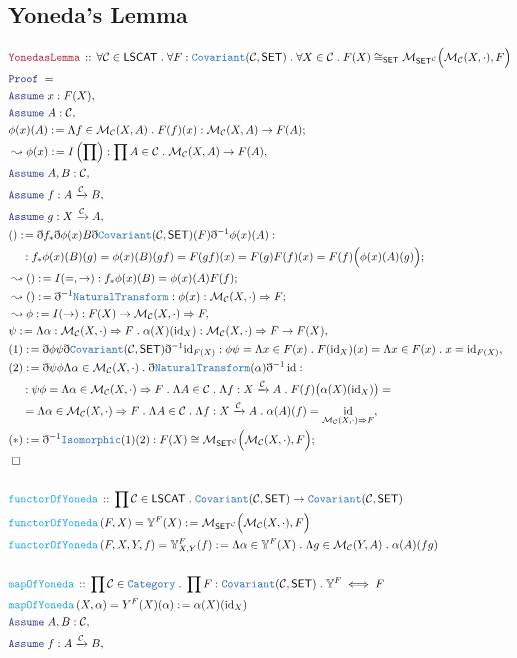 \documentclass[12pt]{scrartcl}
\newcommand{\TYPE}[1]{\textcolor{NavyBlue}{\mathtt{#1}}}
\newcommand{\FUNC}[1]{\textcolor{Cerulean}{\mathtt{#1}}}
\newcommand{\LOGIC}[1]{\textcolor{Blue}{\mathtt{#1}}}
\newcommand{\THM}[1]{\textcolor{Maroon}{\mathtt{#1}}}
\renewcommand{\.}{\; . \;}
\newcommand{\de}{: \kern 0.1pc =}
\newcommand{\Act}[1]{\left( #1 \right)}
\newcommand{\Theorem}[2]{& \THM{#1} \, :: \, #2 \\ & \Proof = \\ }
\newcommand{\DeclareFunc}[2]{& \FUNC{#1} \, :: \, #2 \\}
\newcommand{\DefineNamedFunc}[4]{&  \FUNC{#1}\Act{#2} = #3 \de #4 \\}
\newcommand{\NewLine}{\\ & \kern 1pc}
\newcommand{\Page}[1]{ \begin{align*} #1 \end{align*}   }
\newcommand{ \bd }{ \ByDef }
\DeclareMathOperator*{\id}{id}
\newcommand{\Cat}{\TYPE{Category}}
\newcommand{\Mor}{\mathcal{M}}
\newcommand{\Arrow}{\xrightarrow}
\newcommand{\Say}[3]{& #1 \de #2 : #3, \\}
\newcommand{\Conclude}[3]{& #1 \de #2 : #3; \\}
\newcommand{\Derive}[3]{& \leadsto #1 \de #2 : #3, \\}
\newcommand{\DeriveConclude}[3]{& \leadsto #1 \de #2 : #3 ; \\}
\newcommand{\Assume}[2]{& \LOGIC{Assume} \; #1 : #2, \\}
\newcommand{\QED}{\; \square}
\newcommand{\EndProof}{& \QED \\}
\newcommand{\ByDef}{\eth}
\newcommand{\Proof}{\LOGIC{Proof} \; }
\newcommand{\Cov}{\TYPE{Covariant}}
\newcommand{\NT}{\TYPE{NaturalTransform}}
\newcommand{\C}{\mathcal{C}}
\newcommand{\SET}{\mathsf{SET}}
\begin{document}
\subsection{Yoneda's Lemma}
\Page{
	\Theorem{YonedasLemma}{
		\forall \C \in \mathsf{LSCAT} \. \forall F : \Cov(\C,\SET) \. 
		\forall X \in \C  \. F(X) \cong_\SET \Mor_{\SET^\C}\Big( \Mor_\C(X,\cdot), F  \Big)
	}
	\Assume{x}{F(X)}
	\Assume{A}{\C}
	\Conclude{\phi(x)(A)}{ \Lambda f \in \Mor_\C(X,A) \. F(f)(x)  }{ \Mor_\C(X,A) \to F(A) }
	\Derive{\phi(x)}{I\left(\prod\right)}{ \prod A \in \C \. \Mor_\C(X,A) \to F(A)  }
	\Assume{A,B}{\C}
	\Assume{f}{A \Arrow{\C} B}
	\Assume{g}{X \Arrow{\C} A}
	\Conclude{()}{\bd f_* \bd \phi(x)B \bd \Cov(\C,\SET)(F) \bd^{-1} \phi(x)(A)}{ \NewLine :
		f_* \phi(x)(B)(g) = \phi(x)(B)(gf) = F(gf)(x) = F(g)F(f)(x) = F(f)\Big(\phi(x)(A)(g)\Big)  }
	\DeriveConclude{() }{ I(=,\to) }{ f_* \phi(x)(B) = \phi(x)(A)F(f) }
	\DeriveConclude{()}{\bd^{-1} \NT}{ \phi(x) : \Mor_\C(X,\cdot) \Rightarrow F }
	\Derive{\phi}{I(\to)}{F(X) \to \Mor_\C(X,\cdot) \Rightarrow F}
	\Say{\psi}{ \Lambda \alpha : \Mor_\C(X,\cdot) \Rightarrow F \. \alpha(X)({\id}_{X})  }
	{      \Mor_\C(X,\cdot) \Rightarrow F \to F(X)  }
	\Say{(1)}{ \bd \phi \psi \bd \Cov(\C,\SET) \bd^{-1} {\id}_{F(X)}   }
	{\phi \psi = \Lambda x \in F(x) \. F({\id}_X)(x) = \Lambda x \in F(x) \. x =  {\id}_{F(X)}}
	\Say{(2)}{ \bd \psi \phi \Lambda \alpha \in \Mor_\C(X,\cdot) \. \bd \NT(\alpha) \bd^{-1} \id  }{ 
		\NewLine : \psi \phi = 
		\Lambda \alpha \in \Mor_\C(X,\cdot) \Rightarrow F \. \Lambda A \in \C \. 
		\Lambda f : X \Arrow{\C} A \.  F(f) \big(  \alpha(X)({\id}_X) \big) = \NewLine = 
		\Lambda \alpha \in \Mor_\C(X,\cdot) \Rightarrow F \. \Lambda A \in \C \.
		\Lambda f : X \Arrow{\C} A \. \alpha(A)(f) = \id_{ \Mor_\C(X,\cdot) \Rightarrow   F}
	}
	\Conclude{(*)}{\bd^{-1} \TYPE{Isomorphic}(1)(2)}{ F(X) \cong \Mor_{\SET^\C}\Big( \Mor_\C(X,\cdot),F \Big)  }
	\EndProof
	\\
	\DeclareFunc{functorOfYoneda}{\prod \C \in \mathsf{LSCAT} \. \Cov(\C,\SET) \to \Cov(\C,\SET)}
	\DefineNamedFunc{functorOfYoneda}{F,X}{\mathbb{Y}^F(X)}{\Mor_{\SET^\C}\Big( \Mor_{\C}(X,\cdot), F \Big)}
	\DefineNamedFunc{functorOfYoneda}{F,X,Y,f}{\mathbb{Y}^F_{X,Y}(f)}{ 
		\Lambda \alpha \in \mathbb{Y}^F(X) \. \Lambda g \in \Mor_{\C}(Y,A) \.  \alpha(A)( fg  )   }
	\\
	\DeclareFunc{mapOfYoneda}{
		\prod \C \in \Cat \.  \prod F : \Cov(\C,\SET) \. 
		\mathbb{Y}^F \iff F  
	}
	\DefineNamedFunc{mapOfYoneda}{X,\alpha}{Y^F(X)(\alpha)}{ \alpha(X)({\id}_X) }
	\Assume{A,B}{\C}
	\Assume{f}{A \Arrow{\C} B}
}
\end{document}
